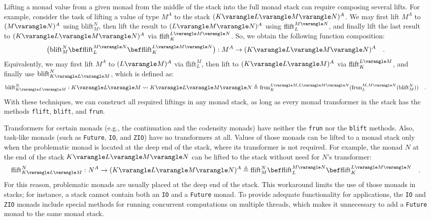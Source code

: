 Lifting a monad value from a given monad from the middle of the stack
into the full monad stack can require composing several lifts. For
example, consider the task of lifting a value of type $M^{A}$ to
the stack $(K\varangle L\varangle M\varangle N)^{A}$. We may first
lift $M^{A}$ to $(M\varangle N)^{A}$ using $\text{blift}_{M}^{N}$,
then lift the result to $(L\varangle M\varangle N)^{A}$ using $\text{flift}_{L}^{M\varangle N}$,
and finally lift the last result to $(K\varangle L\varangle M\varangle N)^{A}$
via $\text{flift}_{K}^{L\varangle M\varangle N}$. So, we obtain the
following function composition:
\[
\big(\text{blift}_{M}^{N}\bef\text{flift}_{L}^{M\varangle N}\bef\text{flift}_{K}^{L\varangle M\varangle N}\big):M^{A}\rightarrow(K\varangle L\varangle M\varangle N)^{A}\quad.
\]
Equivalently, we may first lift $M^{A}$ to $(L\varangle M)^{A}$
via $\text{flift}_{L}^{M}$, then lift to $(K\varangle L\varangle M)^{A}$
via $\text{flift}_{K}^{L\varangle M}$, and finally use $\text{blift}_{K\varangle L\varangle M}^{N}$,
which is defined as:
\[
\text{blift}_{K\varangle L\varangle M}^{N}:K\varangle L\varangle M\leadsto K\varangle L\varangle M\varangle N\triangleq\text{frun}_{K}^{L\varangle M,L\varangle M\varangle N}(\text{frun}_{L}^{M,M\varangle N}(\text{blift}_{M}^{N}))\quad.
\]
With these techniques, we can construct all required liftings in any
monad stack, as long as every monad transformer in the stack has the
methods \lstinline!flift!, \lstinline!blift!, and \lstinline!frun!.

Transformers for certain monads (e.g., the continuation and the codensity
monads) have neither the \lstinline!frun! nor the \lstinline!blift!
methods. Also, task-like monads (such as \lstinline!Future!, \lstinline!IO!,
and \lstinline!ZIO!) have no transformers at all. Values of those
monads can be lifted to a monad stack only when the problematic monad
is located at the deep end of the stack, where its transformer is
not required. For example, the monad $N$ at the end of the stack
$K\varangle L\varangle M\varangle N$ can be lifted to the stack without
need for $N$\textsf{'}s transformer:
\[
\text{flift}_{K\varangle L\varangle M}^{N}:N^{A}\rightarrow(K\varangle L\varangle M\varangle N)^{A}\triangleq\text{flift}_{M}^{N}\bef\text{flift}_{L}^{M\varangle N}\bef\text{flift}_{K}^{L\varangle M\varangle N}\quad.
\]
For this reason, problematic monads are usually placed at the deep
end of the stack. This workaround limits the use of those monads in
stacks; for instance, a stack cannot contain both an \lstinline!IO!
and a \lstinline!Future! monad. To provide adequate functionality
for applications, the \lstinline!IO! and \lstinline!ZIO! monads
include special methods for running concurrent computations on multiple
threads, which makes it unnecessary to add a \lstinline!Future! monad
to the same monad stack.

